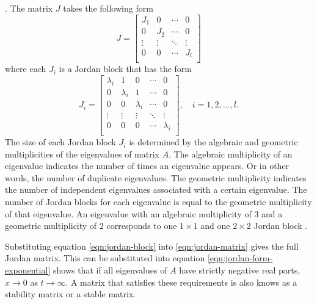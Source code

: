 \cite[Section 7.3]{Hespanha2018LinearTheory}. The matrix $J$ takes the following form
\begin{equation}\label{eqn:jordan-matrix}
    J =
    \begin{bmatrix}
        J_1 & 0 & \cdots & 0 \\
        0 & J_2 & \cdots & 0 \\
        \vdots & \vdots & \ddots & \vdots \\
        0 & 0 & \cdots & J_l \\
    \end{bmatrix}
\end{equation}
where each $J_i$ is a Jordan block that has the form
\begin{equation}\label{eqn:jordan-block}
    J_i = 
    \begin{bmatrix}
        \lambda_i & 1 & 0 & \cdots & 0 \\
        0 & \lambda_i & 1 & \cdots & 0 \\
        0 & 0 & \lambda_i & \cdots & 0 \\
        \vdots & \vdots & \vdots & \ddots & \vdots \\
        0 & 0 & 0 & \cdots & \lambda_i \\
    \end{bmatrix}, \quad i=1,2,\dots,l.
\end{equation}
The size of each Jordan block $J_i$ is determined by the algebraic and geometric multiplicities of the eigenvalues of matrix $A$. The algebraic multiplicity of an eigenvalue indicates the number of times an eigenvalue appears. Or in other words, the number of duplicate eigenvalues. The geometric multiplicity indicates the number of independent eigenvalues associated with a certain eigenvalue.  The number of Jordan blocks for each eigenvalue is equal to the geometric multiplicity of that eigenvalue. An eigenvalue with an algebraic multiplicity of $3$ and a geometric multiplicity of $2$ corresponds to one $1 \times 1$ and one $2 \times 2$ Jordan block \cite[Section 7.1] {Hespanha2018LinearTheory}.

Substituting equation \eqref{eqn:jordan-block} into \eqref{eqn:jordan-matrix} gives the full Jordan matrix. This can be substituted into equation \eqref{eqn:jordan-form-exponential} shows that if all eigenvalues of $A$ have strictly negative real parts, $x \rightarrow 0$ as $t \rightarrow \infty$. A matrix that satisfies these requirements is also knows as a stability matrix or a stable matrix. 

